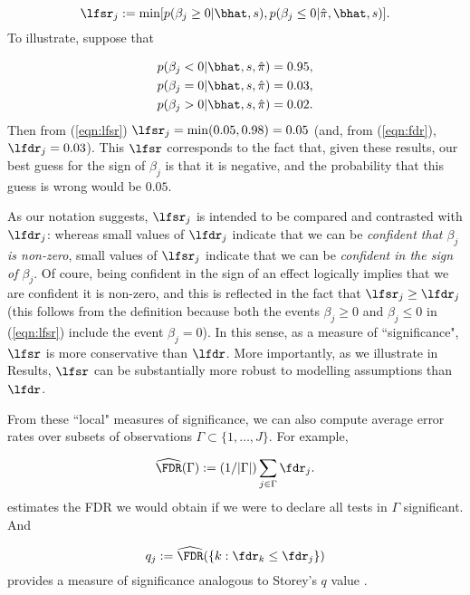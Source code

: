 \begin{equation}
\label{eqn:lfsr}
\lfsr_j := \min[ p(\beta_j \geq 0| \bhat, s), p(\beta_j \leq 0| \hat\pi, \bhat, s) ].
\end{equation}
To illustrate, suppose that

\begin{gather*}
p(\beta_j < 0| \bhat, s, \hat\pi)=0.95, \\
p(\beta_j =0| \bhat, s, \hat\pi) = 0.03, \\
p(\beta_j >0| \bhat, s, \hat\pi) = 0.02.
\end{gather*}
Then 
from (\ref{eqn:lfsr}) $\lfsr_j=\min(0.05,0.98)=0.05$ (and, from (\ref{eqn:fdr}), $\lfdr_j=0.03$). This $\lfsr$ corresponds to the fact that, given these results, 
our best guess for the sign of $\beta_j$ is that it is negative, and the probability that this guess is wrong would be $0.05$.

As our notation suggests, $\lfsr_j$ is intended to be compared and contrasted with $\lfdr_j$: whereas small values of $\lfdr_j$ indicate that we can be {\it confident that $\beta_j$ is non-zero}, 
small values of $\lfsr_j$ indicate that we can be {\it confident in the sign of $\beta_j$}. 
Of coure, being confident in the sign of an effect logically implies that we are confident it is non-zero, and
this is reflected in the fact that $\lfsr_j \geq \lfdr_j$ 
(this follows from the definition because both the events $\beta_j \geq 0$
and $\beta_j \leq 0$ in (\ref{eqn:lfsr}) include the event $\beta_j=0$).
In this sense, as a measure of ``significance", $\lfsr$ is more conservative than $\lfdr$. More importantly, as we illustrate in Results,
$\lfsr$ can be substantially more robust to modelling assumptions than $\lfdr$.

From these ``local" measures of significance, we can also compute average error rates over subsets of observations
$\Gamma \subset \{1,\dots,J\}$. For example,

\begin{equation}
\label{eqn:FDRhat}
\widehat\FDR(\Gamma):= (1/|\Gamma|) \sum_{j \in \Gamma} \fdr_j. 
\end{equation}
estimates the FDR we would obtain if we were to declare all tests in $\Gamma$ significant.
And

\begin{equation}
\label{eqn:qvalue}
q_j := \widehat \FDR(\{k: \fdr_k \leq \fdr_j\}) 
\end{equation}
provides a measure of significance analogous to Storey's $q$ value \cite{storey.03}.

